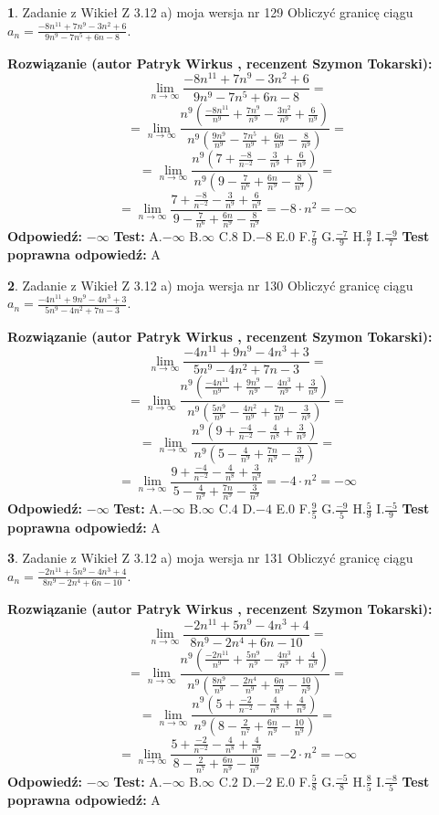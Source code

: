 \documentclass[12pt, a4paper]{article}
\theoremstyle{definition} %
\newtheorem{zad}{}
\newcommand{\zadStart}[1]{\begin{zad}#1\newline}
\newcommand{\zadStop}{\end{zad}}
\newcommand{\rozwStart}[2]{\noindent \textbf{Rozwiązanie (autor #1 , recenzent #2): }\newline}
\newcommand{\rozwStop}{\newline}
\newcommand{\odpStart}{\noindent \textbf{Odpowiedź:}\newline}
\newcommand{\odpStop}{\newline}
\newcommand{\testStart}{\noindent \textbf{Test:}\newline}
\newcommand{\testStop}{\newline}
\newcommand{\kluczStart}{\noindent \textbf{Test poprawna odpowiedź:}\newline}
\newcommand{\kluczStop}{\newline}
\begin{document}
\zadStart{Zadanie z Wikieł Z 3.12 a) moja wersja nr 129}
Obliczyć granicę ciągu $a_{n}=\frac{-8n^{11}+7n^{9}-3n^{2}+6}{9n^{9}-7n^{5}+6n-8}$.
\zadStop
\rozwStart{Patryk Wirkus}{Szymon Tokarski}
$$\lim\limits_{n\to\infty}\frac{-8n^{11}+7n^{9}-3n^{2}+6}{9n^{9}-7n^{5}+6n-8}=$$
$$=\lim\limits_{n\to\infty}\frac{n^{9}\left(\frac{-8n^{11}}{n^{9}}+\frac{7n^{9}}{n^{9}}-\frac{3n^{2}}{n^{9}}+\frac{6}{n^{9}}\right)}{n^{9}\left(\frac{9n^{9}}{n^{9}}-\frac{7n^{5}}{n^{9}}+\frac{6n}{n^{9}}-\frac{8}{n^{9}}\right)}=$$
$$=\lim\limits_{n\to\infty}\frac{n^{9}\left(7+\frac{-8}{n^{-2}}-\frac{3}{n^{9}}+\frac{6}{n^{9}}\right)}
{n^{9}\left(9-\frac{7}{n^{6}}+\frac{6n}{n^{9}}-\frac{8}{n^{9}}\right)}=$$
$$=\lim\limits_{n\to\infty}\frac{7+\frac{-8}{n^{-2}}-\frac{3}{n^{9}}+\frac{6}{n^{9}}}{9-\frac{7}{n^{6}}+\frac{6n}{n^{9}}-\frac{8}{n^{9}}}=-8\cdot n^{2} = -\infty$$
\rozwStop
\odpStart
$-\infty$
\odpStop
\testStart
A.$-\infty$
B.$\infty$
C.$8$
D.$-8$
E.$0$
F.$\frac{7}{9}$
G.$\frac{-7}{9}$
H.$\frac{9}{7}$
I.$\frac{-9}{7}$
\testStop
\kluczStart
A
\kluczStop



\zadStart{Zadanie z Wikieł Z 3.12 a) moja wersja nr 130}
Obliczyć granicę ciągu $a_{n}=\frac{-4n^{11}+9n^{9}-4n^{3}+3}{5n^{9}-4n^{2}+7n-3}$.
\zadStop
\rozwStart{Patryk Wirkus}{Szymon Tokarski}
$$\lim\limits_{n\to\infty}\frac{-4n^{11}+9n^{9}-4n^{3}+3}{5n^{9}-4n^{2}+7n-3}=$$
$$=\lim\limits_{n\to\infty}\frac{n^{9}\left(\frac{-4n^{11}}{n^{9}}+\frac{9n^{9}}{n^{9}}-\frac{4n^{3}}{n^{9}}+\frac{3}{n^{9}}\right)}{n^{9}\left(\frac{5n^{9}}{n^{9}}-\frac{4n^{2}}{n^{9}}+\frac{7n}{n^{9}}-\frac{3}{n^{9}}\right)}=$$
$$=\lim\limits_{n\to\infty}\frac{n^{9}\left(9+\frac{-4}{n^{-2}}-\frac{4}{n^{8}}+\frac{3}{n^{9}}\right)}
{n^{9}\left(5-\frac{4}{n^{9}}+\frac{7n}{n^{9}}-\frac{3}{n^{9}}\right)}=$$
$$=\lim\limits_{n\to\infty}\frac{9+\frac{-4}{n^{-2}}-\frac{4}{n^{8}}+\frac{3}{n^{9}}}{5-\frac{4}{n^{9}}+\frac{7n}{n^{9}}-\frac{3}{n^{9}}}=-4\cdot n^{2} = -\infty$$
\rozwStop
\odpStart
$-\infty$
\odpStop
\testStart
A.$-\infty$
B.$\infty$
C.$4$
D.$-4$
E.$0$
F.$\frac{9}{5}$
G.$\frac{-9}{5}$
H.$\frac{5}{9}$
I.$\frac{-5}{9}$
\testStop
\kluczStart
A
\kluczStop



\zadStart{Zadanie z Wikieł Z 3.12 a) moja wersja nr 131}
Obliczyć granicę ciągu $a_{n}=\frac{-2n^{11}+5n^{9}-4n^{3}+4}{8n^{9}-2n^{4}+6n-10}$.
\zadStop
\rozwStart{Patryk Wirkus}{Szymon Tokarski}
$$\lim\limits_{n\to\infty}\frac{-2n^{11}+5n^{9}-4n^{3}+4}{8n^{9}-2n^{4}+6n-10}=$$
$$=\lim\limits_{n\to\infty}\frac{n^{9}\left(\frac{-2n^{11}}{n^{9}}+\frac{5n^{9}}{n^{9}}-\frac{4n^{3}}{n^{9}}+\frac{4}{n^{9}}\right)}{n^{9}\left(\frac{8n^{9}}{n^{9}}-\frac{2n^{4}}{n^{9}}+\frac{6n}{n^{9}}-\frac{10}{n^{9}}\right)}=$$
$$=\lim\limits_{n\to\infty}\frac{n^{9}\left(5+\frac{-2}{n^{-2}}-\frac{4}{n^{8}}+\frac{4}{n^{9}}\right)}
{n^{9}\left(8-\frac{2}{n^{7}}+\frac{6n}{n^{9}}-\frac{10}{n^{9}}\right)}=$$
$$=\lim\limits_{n\to\infty}\frac{5+\frac{-2}{n^{-2}}-\frac{4}{n^{8}}+\frac{4}{n^{9}}}{8-\frac{2}{n^{7}}+\frac{6n}{n^{9}}-\frac{10}{n^{9}}}=-2\cdot n^{2} = -\infty$$
\rozwStop
\odpStart
$-\infty$
\odpStop
\testStart
A.$-\infty$
B.$\infty$
C.$2$
D.$-2$
E.$0$
F.$\frac{5}{8}$
G.$\frac{-5}{8}$
H.$\frac{8}{5}$
I.$\frac{-8}{5}$
\testStop
\kluczStart
A
\kluczStop
\end{document}
